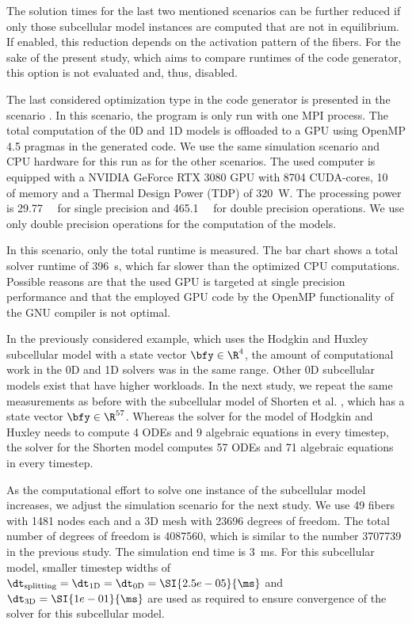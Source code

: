 The solution times for the last two mentioned scenarios can be further reduced if only those subcellular model instances are computed that are not in equilibrium. If enabled, this reduction depends on the activation pattern of the fibers. For the sake of the present study, which aims to compare runtimes of the code generator, this option is not evaluated and, thus, disabled.

The last considered optimization type in the code generator is presented in the scenario . In this scenario, the program is only run with one MPI process. The total computation of the 0D and 1D models is offloaded to a GPU using OpenMP 4.5 pragmas in the generated code. We use the same simulation scenario and CPU hardware for this run as for the other scenarios. The used computer is equipped with a NVIDIA GeForce RTX 3080 GPU with 8704 CUDA-cores, \SI{10}{\giga\byte} of memory and a Thermal Design Power (TDP) of \SI{320}{\watt}. The processing power is \SI{29.77}{\tera\flops} for single precision and \SI{465.1}{\giga\flops} for double precision operations. We use only double precision operations for the computation of the models.

In this scenario, only the total runtime is measured. The bar chart shows a total solver runtime of \SI{396}{\s}, which far slower than the optimized CPU computations. Possible reasons are that the used GPU is targeted at single precision performance and that the employed GPU code by the OpenMP functionality of the GNU compiler is not optimal.

In the previously considered example, which uses the Hodgkin and Huxley subcellular model with a state vector $\bfy \in \R^4$, the amount of computational work in the 0D and 1D solvers was in the same range. Other 0D subcellular models exist that have higher workloads. In the next study, we repeat the same measurements as before with the subcellular model of Shorten et al. \cite{shorten2007mathematical}, which has a state vector $\bfy \in \R^{57}$.  Whereas the solver for the model of Hodgkin and Huxley needs to compute 4 ODEs and 9 algebraic equations in every timestep, the solver for the Shorten model computes 57 ODEs and 71 algebraic equations in every timestep.

As the computational effort to solve one instance of the subcellular model increases, we adjust the simulation scenario for the next study. 
We use 49 fibers with 1481 nodes each and a 3D mesh with \num{23696} degrees of freedom. The total number of degrees of freedom is \num{4087560}, which is similar to the number \num{3707739} in the previous study. The simulation end time is \SI{3}{\ms}. For this subcellular model, smaller timestep widths of $\dt_\text{splitting}=\dt_\text{1D}=\dt_\text{0D}=\SI{2.5e-05}{\ms}$ and $\dt_\text{3D}=\SI{1e-01}{\ms}$ are used as required to ensure convergence of the solver for this subcellular model.

